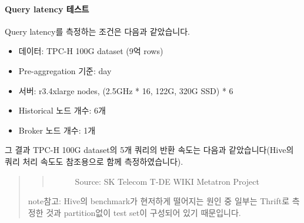 \documentclass[letterpaper,10pt,english]{sphinxmanual}
\begin{document}
\paragraph{Query latency 테스트}
\label{\detokenize{discovery/part01/druid_tests:id3}}
Query latency를 측정하는 조건은 다음과 같았습니다.
\begin{itemize}
\item {} 
데이터: TPC-H 100G dataset (9억 rows)

\item {} 
Pre-aggregation 기준: day

\item {} 
서버: r3.4xlarge nodes, (2.5GHz * 16, 122G, 320G SSD) * 6

\item {} 
Historical 노드 개수: 6개

\item {} 
Broker 노드 개수: 1개

\end{itemize}

그 결과 TPC-H 100G dataset의 5개 쿼리의 반환 속도는 다음과 같았습니다(Hive의 쿼리 처리 속도도 참조용으로 함께 측정하였습니다).
\begin{quote}
\begin{quote}

\begin{figure}[H]
\centering
\capstart

\noindent{}
\caption{Source: SK Telecom T-DE WIKI Metatron Project}\label{\detokenize{discovery/part01/druid_tests:id15}}\end{figure}
\end{quote}

\begin{sphinxadmonition}{note}{참고:}
Hive의 benchmark가 현저하게 떨어지는 원인 중 일부는 Thrift로 측정한 것과 partition없이 test set이 구성되어 있기 때문입니다.
\end{sphinxadmonition}
\end{quote}
\end{document}

